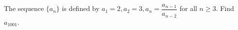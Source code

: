 The sequence $\{a_{n}\}$ is defined by $a_{1}=2, a_{2}=3, a_{n}=\dfrac{a_{n-1}}{a_{n-2}}$ for all $n\geqslant3$. Find $a_{1001}$.
